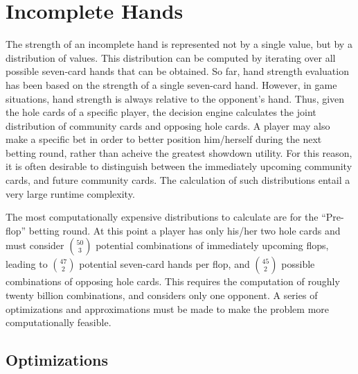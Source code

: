\section{Incomplete Hands}
\label{sec:IncompleteHands}

The strength of an incomplete hand is represented not by a single value, but by a distribution of values.
This distribution can be computed by iterating over all possible seven-card hands that can be obtained.%
So far, hand strength evaluation has been based on the strength of a single seven-card hand.
However, in game situations, hand strength is always relative to the opponent's hand.
Thus, given the hole cards of a specific player, the decision engine calculates the joint distribution of community cards and opposing hole cards.
A player may also make a specific bet in order to better position him/herself during the next betting round, rather than acheive the greatest showdown utility.
For this reason, it is often desirable to distinguish between the immediately upcoming community cards, and future community cards.
The calculation of such distributions entail a very large runtime complexity.

The most computationally expensive distributions to calculate are for the ``Pre-flop'' betting round.
At this point a player has only his/her two hole cards and must consider $\binom{50}{3}$ potential combinations of immediately upcoming flops, leading to $\binom{47}{2}$ potential seven-card hands per flop, and $\binom{45}{2}$ possible combinations of opposing hole cards.
This requires the computation of roughly twenty billion combinations, and considers only one opponent.
A series of optimizations and approximations must be made to make the problem more computationally feasible. %

\subsection{Optimizations}
\label{sec:Optimizations}

